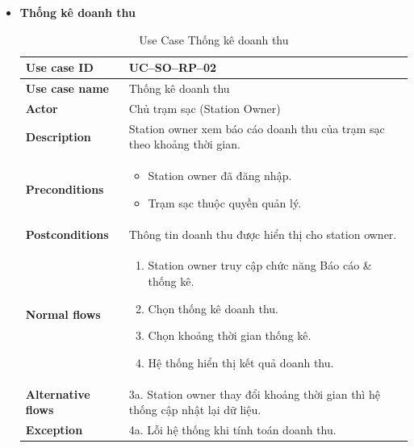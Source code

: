 \begin{enumerate}[label=\textbf{\alph*)}]
\begin{itemize}
  \item \textbf{Thống kê doanh thu}
    \begin{center}
      \renewcommand{\arraystretch}{1.5}
      \begin{longtable}{|m{}|m{}|}
          \caption{Use Case Thống kê doanh thu}
        \label{tab:uc_so_rp_02} \\
        \hline
        \textbf{Use case ID} & UC--SO--RP--02 \\
        \hline
        \textbf{Use case name} & Thống kê doanh thu \\
        \hline
        \textbf{Actor} & Chủ trạm sạc (Station Owner) \\
        \hline
        \textbf{Description} &
        Station owner xem báo cáo doanh thu của trạm sạc theo khoảng thời gian. \\
        \hline
        \textbf{Preconditions} &
        \begin{itemize}
          \item Station owner đã đăng nhập.
          \item Trạm sạc thuộc quyền quản lý.
        \end{itemize}\\
        \hline
        \textbf{Postconditions} &
        Thông tin doanh thu được hiển thị cho station owner.\\
        \hline
        \textbf{Normal flows} &
        \begin{enumerate}[label=\arabic*.]
          \item Station owner truy cập chức năng Báo cáo \& thống kê.
          \item Chọn thống kê doanh thu.
          \item Chọn khoảng thời gian thống kê.
          \item Hệ thống hiển thị kết quả doanh thu.
        \end{enumerate}\\
        \hline
        \textbf{Alternative flows} &
        3a. Station owner thay đổi khoảng thời gian thì hệ thống
        cập nhật lại dữ liệu.\\
        \hline
        \textbf{Exception} &
        4a. Lỗi hệ thống khi tính toán doanh thu.\\

        \hline
        \end{longtable}
    \end{center}


\end{itemize}
\end{enumerate}
